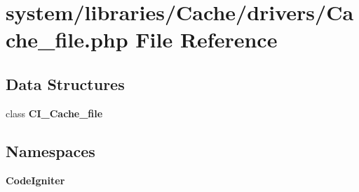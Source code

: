 \section{system/libraries/\-Cache/drivers/\-Cache\-\_\-file.php File Reference}
\label{_cache__file_8php}
\subsection*{Data Structures}
\begin{DoxyCompactItemize}
\item 
class {\bf C\-I\-\_\-\-Cache\-\_\-file}
\end{DoxyCompactItemize}
\subsection*{Namespaces}
\begin{DoxyCompactItemize}
\item 
{\bf Code\-Igniter}
\end{DoxyCompactItemize}
